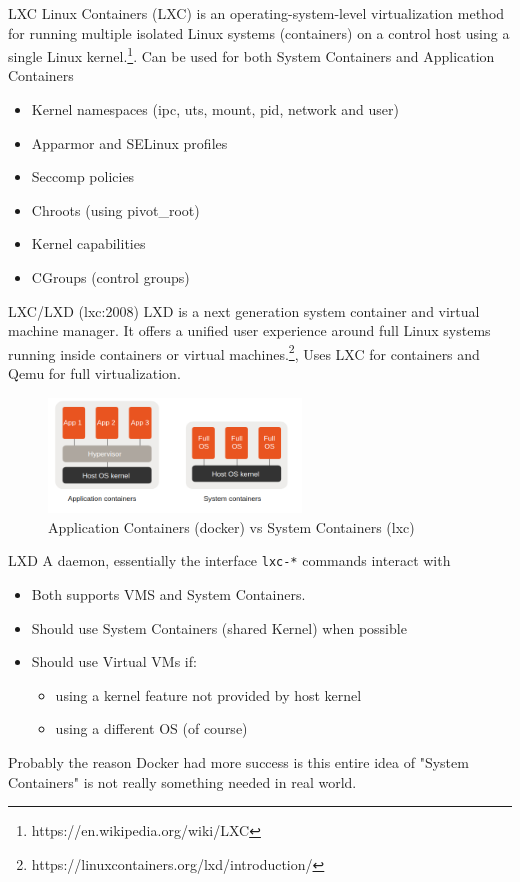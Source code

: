 \documentclass[english]{tumbeamer}
\begin{document}
\begin{frame}{LXC}
Linux Containers (LXC) is an operating-system-level virtualization method for running multiple isolated Linux systems (containers) on a control host using a single Linux kernel.\footnote{https://en.wikipedia.org/wiki/LXC}.
Can be used for both System Containers and Application Containers
\vspace{3mm}
\begin{itemize}
    \item Kernel namespaces (ipc, uts, mount, pid, network and user)
    \item Apparmor and SELinux profiles
    \item Seccomp policies
    \item Chroots (using pivot\_root)
    \item Kernel capabilities
    \item CGroups (control groups)
\end{itemize}
\end{frame}

\begin{frame}{LXC/LXD (lxc:2008)}
LXD is a next generation system container and virtual machine manager. It offers a unified user experience around full Linux systems running inside containers or virtual machines.\footnote{https://linuxcontainers.org/lxd/introduction/}, Uses LXC for containers and Qemu for full virtualization.
\begin{figure}
    \centering
    \includegraphics[width=0.6\textwidth]{application_vs_system.png}
    \caption{Application Containers (docker) vs System Containers (lxc)}
\end{figure}
\end{frame}

\begin{frame}{LXD}
A daemon, essentially the interface \texttt{lxc-*} commands interact with
\begin{itemize}
    \item Both supports VMS and System Containers.
    \item Should use System Containers (shared Kernel) when possible
    \item Should use Virtual VMs if:
        \begin{itemize}
            \item using a kernel feature not provided by host kernel
            \item using a different OS (of course)
        \end{itemize}
\end{itemize}
Probably the reason Docker had more success is this entire idea of "System Containers" is not really something needed in real world.
\end{frame}
\end{document}
